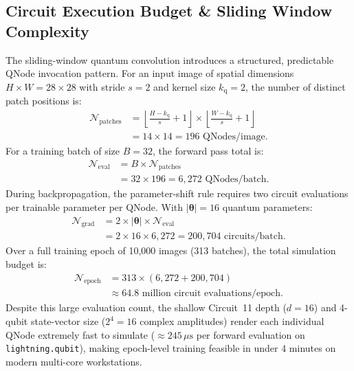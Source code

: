 \documentclass[journal]{IEEEtran}
\begin{document}
\subsection{Circuit Execution Budget \& Sliding Window Complexity}
The sliding-window quantum convolution introduces a structured, predictable QNode invocation pattern. For an input image of spatial dimensions $H \times W = 28 \times 28$ with stride $s = 2$ and kernel size $k_{\mathrm{q}} = 2$, the number of distinct patch positions is:
\begin{align}
\mathcal{N}_{\mathrm{patches}} &= \left\lfloor \frac{H - k_{\mathrm{q}}}{s} + 1 \right\rfloor \times \left\lfloor \frac{W - k_{\mathrm{q}}}{s} + 1 \right\rfloor \nonumber \\
&= 14 \times 14 = 196 \text{ QNodes/image}.
\label{eq:patch_count}
\end{align}
For a training batch of size $B = 32$, the forward pass total is:
\begin{align}
\mathcal{N}_{\mathrm{eval}} &= B \times \mathcal{N}_{\mathrm{patches}} \nonumber \\
&= 32 \times 196 = 6,272 \text{ QNodes/batch}.
\label{eq:qnode_budget}
\end{align}
During backpropagation, the parameter-shift rule requires two circuit evaluations per trainable parameter per QNode. With $|\boldsymbol{\theta}| = 16$ quantum parameters:
\begin{align}
\mathcal{N}_{\mathrm{grad}} &= 2 \times |\boldsymbol{\theta}| \times \mathcal{N}_{\mathrm{eval}} \nonumber \\
&= 2 \times 16 \times 6,272 = 200,704 \text{ circuits/batch}.
\label{eq:grad_eval_budget}
\end{align}
Over a full training epoch of 10,000 images (313 batches), the total simulation budget is:
\begin{align}
\mathcal{N}_{\mathrm{epoch}} &= 313 \times (6,272 + 200,704) \nonumber \\
&\approx 64.8 \text{ million circuit evaluations/epoch}.
\end{align}
Despite this large evaluation count, the shallow Circuit~11 depth ($d = 16$) and 4-qubit state-vector size ($2^4 = 16$ complex amplitudes) render each individual QNode extremely fast to simulate ($\approx 245\,\mu\mathrm{s}$ per forward evaluation on \texttt{lightning.qubit}), making epoch-level training feasible in under 4 minutes on modern multi-core workstations.
\end{document}
